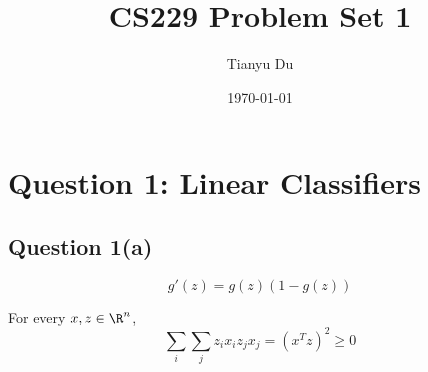 \documentclass[11pt]{article}
\title{CS229 Problem Set 1}
\date{\today}
\author{Tianyu Du}
\begin{document}
	\maketitle
	\newpage
	\section{Question 1: Linear Classifiers}
	\subsection{Question 1(a)}
	\begin{lemma}
		\begin{equation}
			g'(z) = g(z) \left(1-g(z)\right)
		\end{equation}
	\end{lemma}
	
	\begin{lemma} For every $x, z \in \R^n$,
		\begin{equation}
			\sum_i \sum_j z_i x_i z_j x_j = (x^T z)^2 \geq 0
		\end{equation}
	\end{lemma}
	
\end{document}
